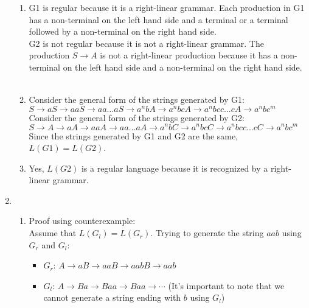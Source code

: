 \documentclass[a4paper]{article}
\begin{document}
\begin{enumerate}
\begin{enumerate}
            \item G1 is regular because it is a right-linear grammar. Each production in G1 has a non-terminal on the left hand side and a terminal or a terminal followed by a non-terminal on the right hand side. \\
            
            G2 is not regular because it is not a right-linear grammar. The production $S \rightarrow A$ is not a right-linear production because it has a non-terminal on the left hand side and a non-terminal on the right hand side. \\ \\

            \item Consider the general form of the strings generated by G1:\\
            $S \rightarrow aS \rightarrow aaS \rightarrow aa \dots aS \rightarrow a^nbA \rightarrow a^nbcA \rightarrow a^nbcc...cA \rightarrow a^nbc^m$ \\
            
            Consider the general form of the strings generated by G2:\\
            $S \rightarrow A \rightarrow aA \rightarrow aaA \rightarrow aa \dots aA \rightarrow a^nbC \rightarrow a^nbcC \rightarrow a^nbcc...cC \rightarrow a^nbc^m$ \\

            Since the strings generated by G1 and G2 are the same, $L(G1) = L(G2)$. \\

            \item Yes, $L(G2)$ is a regular language because it is recognized by a right-linear grammar. \\
        \end{enumerate}

        \newpage
        \item \begin{enumerate}
            \item Proof using counterexample: \\

            Assume that $L(G_l) = L(G_r)$. Trying to generate the string $aab$ using $G_r$ and $G_l$:
            \begin{itemize}
                \item $G_r$: $A \rightarrow aB \rightarrow aaB \rightarrow aabB \rightarrow aab$
                \item $G_l$: $A \rightarrow Ba \rightarrow Baa \rightarrow Baa \rightarrow \cdots$ (It's important to note that we cannot generate a string ending with $b$ using $G_l$)
            \end{itemize}


\end{enumerate}
\end{enumerate}
\end{document}
